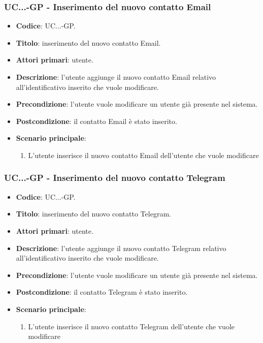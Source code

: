 			\subsubsection{UC\theuccount.\thesubuccount.\thesubsubuccount.\thesubsubsubuccount-GP - Inserimento del nuovo contatto Email}
				
				\begin{itemize}
					\item \textbf{Codice}: UC\theuccount.\thesubuccount.\thesubsubuccount.\thesubsubsubuccount-GP.
					\item \textbf{Titolo}: inserimento del nuovo contatto Email.
					\item \textbf{Attori primari}: utente.
					\item \textbf{Descrizione}: l'utente aggiunge il nuovo contatto Email relativo all'identificativo inserito che vuole modificare.
					\item \textbf{Precondizione}: l'utente vuole modificare un utente già presente nel sistema.
					\item \textbf{Postcondizione}: il contatto Email è stato inserito.
					\item \textbf{Scenario principale}:
					\begin{enumerate}
						\item L'utente inserisce il nuovo contatto Email dell'utente che vuole modificare
					\end{enumerate}
				\end{itemize}
			
			\subsubsection{UC\theuccount.\thesubuccount.\thesubsubuccount.\thesubsubsubuccount-GP - Inserimento del nuovo contatto Telegram}
				
				\begin{itemize}
					\item \textbf{Codice}: UC\theuccount.\thesubuccount.\thesubsubuccount.\thesubsubsubuccount-GP.
					\item \textbf{Titolo}: inserimento del nuovo contatto Telegram.
					\item \textbf{Attori primari}: utente.
					\item \textbf{Descrizione}: l'utente aggiunge il nuovo contatto Telegram relativo all'identificativo inserito che vuole modificare.
					\item \textbf{Precondizione}: l'utente vuole modificare un utente già presente nel sistema.
					\item \textbf{Postcondizione}: il contatto Telegram è stato inserito.
					\item \textbf{Scenario principale}:
					\begin{enumerate}
						\item L'utente inserisce il nuovo contatto Telegram dell'utente che vuole modificare
					\end{enumerate}
				\end{itemize}
			
